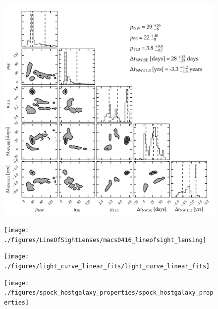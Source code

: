 
\begin{figure}[tbp]
  \begin{center}
    \includegraphics[width=\textwidth]{./figures/composite_lens_model_contours/composite_lens_model_contours}
    \caption{ \protect}
  \end{center}
\end{figure}


\begin{figure}[tbp]
  \begin{center}
    \texttt{[image: ./figures/LineOfSightLenses/macs0416\_lineofsight\_lensing]}
    \caption{\protect}
  \end{center}
\end{figure}

\begin{figure}[tbp]
  \begin{center}
    \texttt{[image: ./figures/light\_curve\_linear\_fits/light\_curve\_linear\_fits]}
    \caption{\protect}
  \end{center}
\end{figure}

\begin{figure}[tbp]
  \begin{center}
    \texttt{[image: ./figures/spock\_hostgalaxy\_properties/spock\_hostgalaxy\_properties]}
    \caption{\protect}
  \end{center}
\end{figure}

